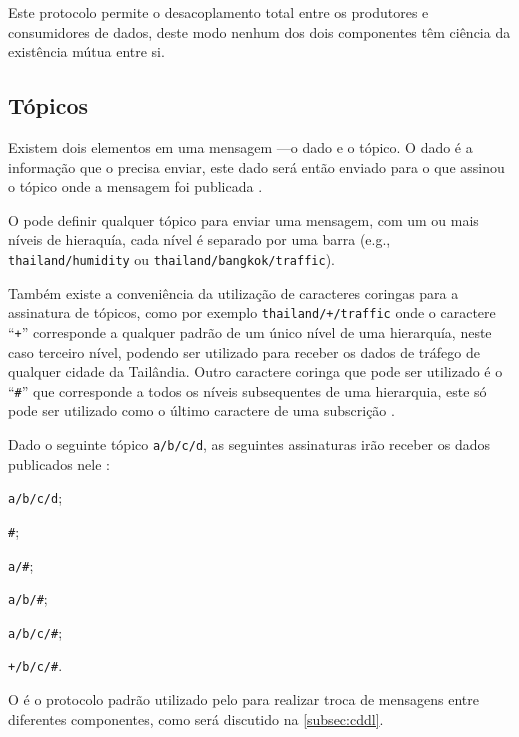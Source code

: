 Este protocolo permite o desacoplamento total entre os produtores e consumidores de dados, deste modo nenhum dos dois componentes têm ciência da existência mútua entre si.

\subsection{Tópicos \mqtt} \label{subsec:mqtt-topics}

Existem dois elementos em uma mensagem \mqtt---o dado e o tópico. O dado é a informação que o \pub precisa enviar, este dado será então enviado para o \sub que assinou o tópico onde a mensagem foi publicada \cite{tantitharanukul:et-al:2017}.

O \pub pode definir qualquer tópico para enviar uma mensagem, com um ou mais níveis de hieraquía, cada nível é separado por uma barra (e.g., \texttt{thailand/humidity} ou \texttt{thailand/bangkok/traffic}).

Também existe a conveniência da utilização de caracteres coringas para a assinatura de tópicos, como por exemplo \texttt{thailand/+/traffic} onde o caractere ``\texttt{+}'' corresponde a qualquer padrão de um único nível de uma hierarquía, neste caso terceiro nível, podendo ser utilizado para receber os dados de tráfego de qualquer cidade da Tailândia. Outro caractere coringa que pode ser utilizado é o ``\texttt{\#}'' que corresponde a todos os níveis subsequentes de uma hierarquia, este só pode ser utilizado como o último caractere de uma subscrição \cite{hunkeler:truong:stanford-clark:2008}.

Dado o seguinte tópico \texttt{a/b/c/d}, as seguintes assinaturas irão receber os dados publicados nele \cite{light:mosquitto}:

\begin{alineas}
	\item \texttt{a/b/c/d};
	\item \texttt{\#};
	\item \texttt{a/\#};
	\item \texttt{a/b/\#};
	\item \texttt{a/b/c/\#};
	\item \texttt{+/b/c/\#}.
\end{alineas}

O \mqtt é o protocolo padrão utilizado pelo \cddl para realizar troca de mensagens entre diferentes componentes, como será discutido na \autoref{subsec:cddl}.
		
\section{\mhubcddl}

